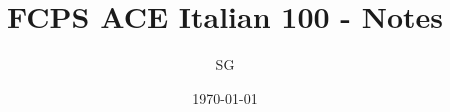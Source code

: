     \title{FCPS ACE Italian 100 - Notes}
    \author{SG}
    \date{\today}
    \maketitle
    \tableofcontents
    
